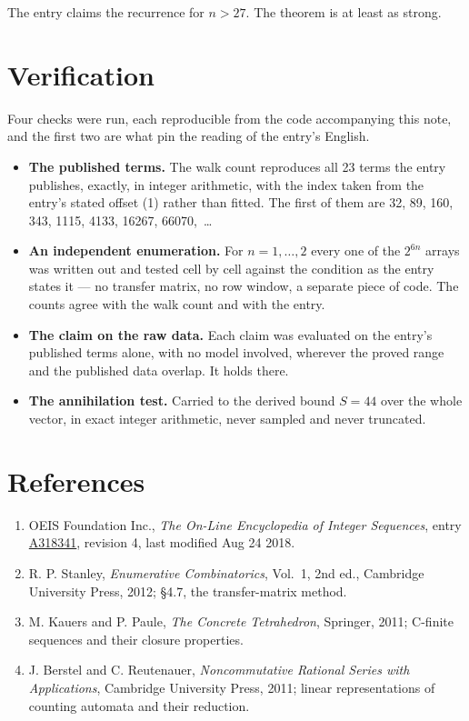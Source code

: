 \documentclass[11pt]{article}
\theoremstyle{definition}
\begin{document}
The entry claims the recurrence for $n > 27$. The theorem is at least as strong.

\section{Verification}

Four checks were run, each reproducible from the code accompanying this note, and the first two are what pin the reading of the entry's English.

\begin{itemize}

\item {\bfseries The published terms.} The walk count reproduces all 23 terms the entry publishes, exactly, in integer arithmetic, with the index taken from the entry's stated offset (1) rather than fitted. The first of them are 32, 89, 160, 343, 1115, 4133, 16267, 66070,~\dots

\item {\bfseries An independent enumeration.} For $n = 1,\dots,2$ every one of the $2^{6n}$ arrays was written out and tested cell by cell against the condition as the entry states it --- no transfer matrix, no row window, a separate piece of code. The counts agree with the walk count and with the entry.

\item {\bfseries The claim on the raw data.} Each claim was evaluated on the entry's published terms alone, with no model involved, wherever the proved range and the published data overlap. It holds there.

\item {\bfseries The annihilation test.} Carried to the derived bound $S = 44$ over the whole vector, in exact integer arithmetic, never sampled and never truncated.

\end{itemize}

\section{References}

\begin{enumerate}

\item OEIS Foundation Inc., \emph{The On-Line Encyclopedia of Integer Sequences}, entry \href{https://oeis.org/A318341}{A318341}, revision 4, last modified Aug 24 2018.

\item R. P. Stanley, \emph{Enumerative Combinatorics}, Vol.~1, 2nd ed., Cambridge University Press, 2012; \S4.7, the transfer-matrix method.

\item M. Kauers and P. Paule, \emph{The Concrete Tetrahedron}, Springer, 2011; C-finite sequences and their closure properties.

\item J. Berstel and C. Reutenauer, \emph{Noncommutative Rational Series with Applications}, Cambridge University Press, 2011; linear representations of counting automata and their reduction.

\end{enumerate}
\end{document}
